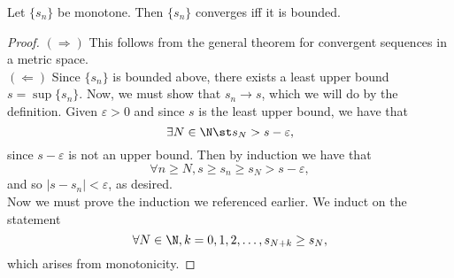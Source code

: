 \documentclass{notes}
\begin{document}
\begin{theorem}
  Let $\{s_n\}$ be monotone. Then $\{s_n\}$ converges iff it is bounded.
\end{theorem}
\begin{proof}
  $(\Rightarrow)$ This follows from the general theorem for convergent sequences in a metric space. \\

  $(\Leftarrow)$ Since $\{s_n\}$ is bounded above, there exists a least upper bound $s = \sup \{s_n\}$.
  Now, we must show that $s_n \to s$, which we will do by the definition. Given $\varepsilon > 0$ and 
  since $s$ is the least upper bound, we have that $$\exists N\in\N \st s_N > s - \varepsilon,$$ since
  $s - \varepsilon$ is not an upper bound. Then by induction we have that $$\forall n \geq N, s \geq 
  s_n \geq s_N > s-\varepsilon,$$ and so $|s - s_n| < \varepsilon$, as desired. \\

  Now we must prove the induction we referenced earlier. We induct on the statement $$\forall N\in\N,
  k = 0, 1, 2, \ldots, s_{N + k} \geq s_N,$$ which arises from monotonicity.
  
\end{proof}
\end{document}
